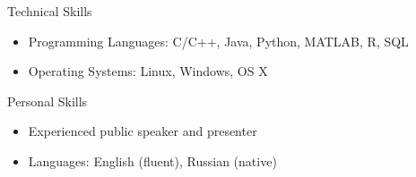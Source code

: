 \documentclass{resume} %
\begin{document}






\begin{rSection}{Technical Skills}
\begin{itemize}
	\item Programming Languages: C/C++, Java, Python, MATLAB, R, SQL
	\item Operating Systems: Linux, Windows, OS X
\end{itemize}
\end{rSection}


\begin{rSection}{Personal Skills}
\begin{itemize}
	\item Experienced public speaker and presenter
	\item Languages: English (fluent), Russian (native)
\end{itemize}
\end{rSection}

\pagebreak

\end{document}
